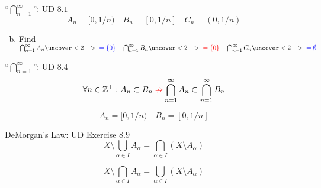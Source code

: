 \begin{frame}{}
  \begin{exampleblock}{``$\bigcap_{n = 1}^{\infty}$'': UD $8.1$}
    \[
      A_n = [0, 1/n) \quad B_n = [0, 1/n] \quad C_n = (0, 1/n)
    \]

    \begin{enumerate}[(a)]
      \setcounter{enumi}{1}
      \item Find $\bigcap_{n=1}^{\infty} A_n \uncover<2->{\blue{\;= \set{0}}}
	\quad \bigcap_{n=1}^{\infty} B_n \uncover<2->{\red{\;= \set{0}}} 
	\quad \bigcap_{n=1}^{\infty} C_n \uncover<2->{\blue{\;= \emptyset}}$
    \end{enumerate}
  \end{exampleblock}

  \vspace{0.50cm}
  
  \vspace{0.30cm}
\end{frame}

\begin{frame}{}
  \begin{exampleblock}{``$\bigcap_{n = 1}^{\infty}$'': UD $8.4$}
    \[
      \forall n \in \mathbb{Z}^{+}: A_n \subset B_n \textcolor{red}{\;\nRightarrow} \bigcap_{n=1}^{\infty} A_n \subset \bigcap_{n=1}^{\infty} B_n
    \]
  \end{exampleblock}

  \[
    A_n = [0, 1/n) \quad B_n = [0, 1/n]
  \]

  \pause
  \vspace{0.40cm}
\end{frame}

\begin{frame}{}
  \begin{exampleblock}{DeMorgan's Law: UD Exercise $8.9$}
    \[
      X \setminus \bigcup_{\alpha \in I} A_{\alpha} = \bigcap_{\alpha \in I} (X \setminus A_{\alpha})
    \]

    \[
      X \setminus \bigcap_{\alpha \in I} A_{\alpha} = \bigcup_{\alpha \in I} (X \setminus A_{\alpha})
    \]
  \end{exampleblock}
\end{frame}

